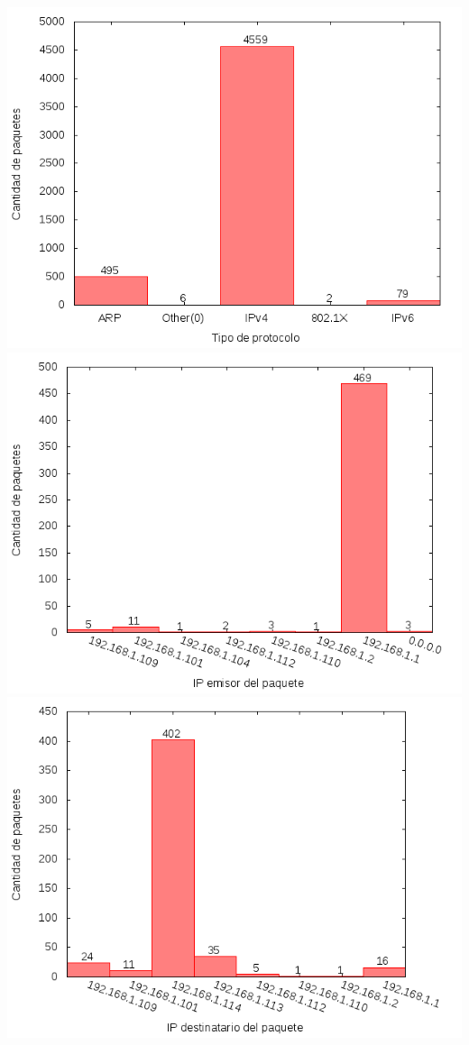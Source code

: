\includegraphics{../mediciones/home-wfi-10/home-wfi-10Protocolos.png}
\includegraphics{../mediciones/home-wfi-10/home-wfi-10IpsSrcArp.png}
\includegraphics{../mediciones/home-wfi-10/home-wfi-10IpsDstArp.png}
